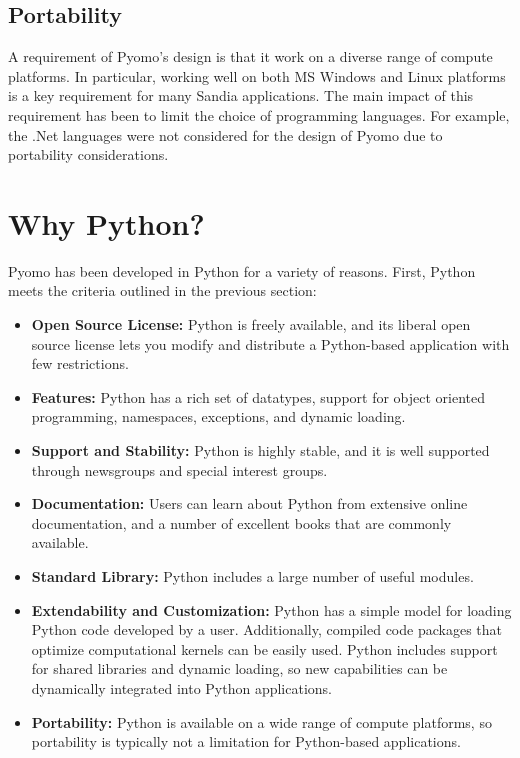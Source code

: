 \subsection{Portability}

A requirement of Pyomo's design is that it work on a diverse range of
compute platforms.  In particular, working well on both MS Windows and
Linux platforms is a key requirement for many Sandia applications.
The main impact of this requirement has been to limit the choice
of programming languages.  For example, the .Net languages were not
considered for the design of Pyomo due to portability considerations.



\section{Why Python?}
\label{sec:python}

Pyomo has been developed in Python for a variety of reasons.  First, Python meets the criteria outlined in the previous section:
\begin{itemize}

\item {\bf Open Source License:} Python is freely available, and its
liberal open source license lets you modify and distribute a Python-based
application with few restrictions.

\item {\bf Features:} Python has a rich set of datatypes, support for
object oriented programming, namespaces, exceptions, and dynamic loading.

\item {\bf Support and Stability:} Python is highly stable, and it is
well supported through newsgroups and special interest groups.

\item {\bf Documentation:} Users can learn about Python from extensive
online documentation, and a number of excellent books that are commonly
available.

\item {\bf Standard Library:} Python includes a large number of useful modules.

\item {\bf Extendability and Customization:} Python has a simple model
for loading Python code developed by a user.  Additionally, compiled
code packages that optimize computational kernels can be easily used.
Python includes support for shared libraries and dynamic loading, so
new capabilities can be dynamically integrated into Python applications.

\item {\bf Portability:} Python is available on a wide range of compute
platforms, so portability is typically not a limitation for Python-based
applications.

\end{itemize}


